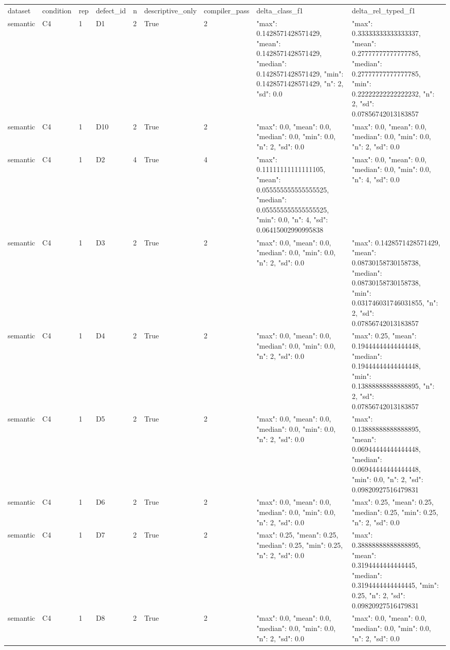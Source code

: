 \begin{tabular}{lllllllll}
dataset & condition & rep & defect\_id & n & descriptive\_only & compiler\_pass & delta\_class\_f1 & delta\_rel\_typed\_f1 \\
semantic & C4 & 1 & D1 & 2 & True & 2 & {"max": 0.1428571428571429, "mean": 0.1428571428571429, "median": 0.1428571428571429, "min": 0.1428571428571429, "n": 2, "sd": 0.0} & {"max": 0.33333333333333337, "mean": 0.27777777777777785, "median": 0.27777777777777785, "min": 0.22222222222222232, "n": 2, "sd": 0.07856742013183857} \\
semantic & C4 & 1 & D10 & 2 & True & 2 & {"max": 0.0, "mean": 0.0, "median": 0.0, "min": 0.0, "n": 2, "sd": 0.0} & {"max": 0.0, "mean": 0.0, "median": 0.0, "min": 0.0, "n": 2, "sd": 0.0} \\
semantic & C4 & 1 & D2 & 4 & True & 4 & {"max": 0.11111111111111105, "mean": 0.055555555555555525, "median": 0.055555555555555525, "min": 0.0, "n": 4, "sd": 0.06415002990995838} & {"max": 0.0, "mean": 0.0, "median": 0.0, "min": 0.0, "n": 4, "sd": 0.0} \\
semantic & C4 & 1 & D3 & 2 & True & 2 & {"max": 0.0, "mean": 0.0, "median": 0.0, "min": 0.0, "n": 2, "sd": 0.0} & {"max": 0.1428571428571429, "mean": 0.08730158730158738, "median": 0.08730158730158738, "min": 0.031746031746031855, "n": 2, "sd": 0.07856742013183857} \\
semantic & C4 & 1 & D4 & 2 & True & 2 & {"max": 0.0, "mean": 0.0, "median": 0.0, "min": 0.0, "n": 2, "sd": 0.0} & {"max": 0.25, "mean": 0.19444444444444448, "median": 0.19444444444444448, "min": 0.13888888888888895, "n": 2, "sd": 0.07856742013183857} \\
semantic & C4 & 1 & D5 & 2 & True & 2 & {"max": 0.0, "mean": 0.0, "median": 0.0, "min": 0.0, "n": 2, "sd": 0.0} & {"max": 0.13888888888888895, "mean": 0.06944444444444448, "median": 0.06944444444444448, "min": 0.0, "n": 2, "sd": 0.09820927516479831} \\
semantic & C4 & 1 & D6 & 2 & True & 2 & {"max": 0.0, "mean": 0.0, "median": 0.0, "min": 0.0, "n": 2, "sd": 0.0} & {"max": 0.25, "mean": 0.25, "median": 0.25, "min": 0.25, "n": 2, "sd": 0.0} \\
semantic & C4 & 1 & D7 & 2 & True & 2 & {"max": 0.25, "mean": 0.25, "median": 0.25, "min": 0.25, "n": 2, "sd": 0.0} & {"max": 0.38888888888888895, "mean": 0.3194444444444445, "median": 0.3194444444444445, "min": 0.25, "n": 2, "sd": 0.09820927516479831} \\
semantic & C4 & 1 & D8 & 2 & True & 2 & {"max": 0.0, "mean": 0.0, "median": 0.0, "min": 0.0, "n": 2, "sd": 0.0} & {"max": 0.0, "mean": 0.0, "median": 0.0, "min": 0.0, "n": 2, "sd": 0.0} \\

\end{tabular}
